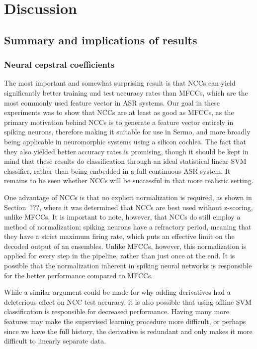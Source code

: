 \chapter{Discussion}
\label{chapt:discussion}

\section{Summary and implications of results}

\subsection{Neural cepstral coefficients}

The most important and somewhat surprising result
is that NCCs can yield significantly
better training and test accuracy rates than MFCCs,
which are the most commonly used
feature vector in ASR systems.
Our goal in these experiments was to
show that NCCs are at least as good as MFCCs,
as the primary motivation behind
NCCs is to generate a feature vector
entirely in spiking neurons,
therefore making it suitable
for use in Sermo,
and more broadly being applicable
in neuromorphic systems using
a silicon cochlea.
The fact that they also yielded
better accuracy rates
is promising,
though it should be kept in mind
that these results
do classification through
an ideal statistical linear SVM classifier,
rather than being embedded
in a full continuous ASR system.
It remains to be seen
whether NCCs will be successful
in that more realistic setting.

One advantage of NCCs is that
no explicit normalization is required,
as shown in Section~???,
where it was determined
that NCCs are best used
without z-scoring, unlike MFCCs.
It is important to note, however,
that NCCs do still employ a method
of normalization;
spiking neurons have a refractory period,
meaning that they have a strict maximum firing rate,
which puts an effective limit on the
decoded output of an ensembles.
Unlike MFCCs, however,
this normalization is applied
for every step in the pipeline,
rather than just once at the end.
It is possible that
the normalization inherent in
spiking neural networks
is responsible for the better performance
compared to MFCCs.

While a similar argument could be made
for why adding derivatives had
a deleterious effect on
NCC test accuracy,
it is also possible that
using offline SVM classification
is responsible for decreased performance.
Having many more features
may make the supervised learning procedure
more difficult,
or perhaps since we have the full history,
the derivative is redundant
and only makes it more difficult
to linearly separate data.


